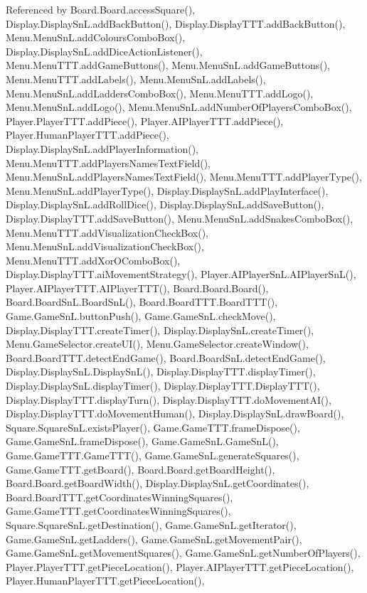 Referenced by Board.\+Board.\+access\+Square(), Display.\+Display\+Sn\+L.\+add\+Back\+Button(), Display.\+Display\+T\+T\+T.\+add\+Back\+Button(), Menu.\+Menu\+Sn\+L.\+add\+Colours\+Combo\+Box(), Display.\+Display\+Sn\+L.\+add\+Dice\+Action\+Listener(), Menu.\+Menu\+T\+T\+T.\+add\+Game\+Buttons(), Menu.\+Menu\+Sn\+L.\+add\+Game\+Buttons(), Menu.\+Menu\+T\+T\+T.\+add\+Labels(), Menu.\+Menu\+Sn\+L.\+add\+Labels(), Menu.\+Menu\+Sn\+L.\+add\+Ladders\+Combo\+Box(), Menu.\+Menu\+T\+T\+T.\+add\+Logo(), Menu.\+Menu\+Sn\+L.\+add\+Logo(), Menu.\+Menu\+Sn\+L.\+add\+Number\+Of\+Players\+Combo\+Box(), Player.\+Player\+T\+T\+T.\+add\+Piece(), Player.\+A\+I\+Player\+T\+T\+T.\+add\+Piece(), Player.\+Human\+Player\+T\+T\+T.\+add\+Piece(), Display.\+Display\+Sn\+L.\+add\+Player\+Information(), Menu.\+Menu\+T\+T\+T.\+add\+Players\+Names\+Text\+Field(), Menu.\+Menu\+Sn\+L.\+add\+Players\+Names\+Text\+Field(), Menu.\+Menu\+T\+T\+T.\+add\+Player\+Type(), Menu.\+Menu\+Sn\+L.\+add\+Player\+Type(), Display.\+Display\+Sn\+L.\+add\+Play\+Interface(), Display.\+Display\+Sn\+L.\+add\+Roll\+Dice(), Display.\+Display\+Sn\+L.\+add\+Save\+Button(), Display.\+Display\+T\+T\+T.\+add\+Save\+Button(), Menu.\+Menu\+Sn\+L.\+add\+Snakes\+Combo\+Box(), Menu.\+Menu\+T\+T\+T.\+add\+Visualization\+Check\+Box(), Menu.\+Menu\+Sn\+L.\+add\+Visualization\+Check\+Box(), Menu.\+Menu\+T\+T\+T.\+add\+Xor\+O\+Combo\+Box(), Display.\+Display\+T\+T\+T.\+ai\+Movement\+Strategy(), Player.\+A\+I\+Player\+Sn\+L.\+A\+I\+Player\+Sn\+L(), Player.\+A\+I\+Player\+T\+T\+T.\+A\+I\+Player\+T\+T\+T(), Board.\+Board.\+Board(), Board.\+Board\+Sn\+L.\+Board\+Sn\+L(), Board.\+Board\+T\+T\+T.\+Board\+T\+T\+T(), Game.\+Game\+Sn\+L.\+button\+Push(), Game.\+Game\+Sn\+L.\+check\+Move(), Display.\+Display\+T\+T\+T.\+create\+Timer(), Display.\+Display\+Sn\+L.\+create\+Timer(), Menu.\+Game\+Selector.\+create\+U\+I(), Menu.\+Game\+Selector.\+create\+Window(), Board.\+Board\+T\+T\+T.\+detect\+End\+Game(), Board.\+Board\+Sn\+L.\+detect\+End\+Game(), Display.\+Display\+Sn\+L.\+Display\+Sn\+L(), Display.\+Display\+T\+T\+T.\+display\+Timer(), Display.\+Display\+Sn\+L.\+display\+Timer(), Display.\+Display\+T\+T\+T.\+Display\+T\+T\+T(), Display.\+Display\+T\+T\+T.\+display\+Turn(), Display.\+Display\+T\+T\+T.\+do\+Movement\+A\+I(), Display.\+Display\+T\+T\+T.\+do\+Movement\+Human(), Display.\+Display\+Sn\+L.\+draw\+Board(), Square.\+Square\+Sn\+L.\+exists\+Player(), Game.\+Game\+T\+T\+T.\+frame\+Dispose(), Game.\+Game\+Sn\+L.\+frame\+Dispose(), Game.\+Game\+Sn\+L.\+Game\+Sn\+L(), Game.\+Game\+T\+T\+T.\+Game\+T\+T\+T(), Game.\+Game\+Sn\+L.\+generate\+Squares(), Game.\+Game\+T\+T\+T.\+get\+Board(), Board.\+Board.\+get\+Board\+Height(), Board.\+Board.\+get\+Board\+Width(), Display.\+Display\+Sn\+L.\+get\+Coordinates(), Board.\+Board\+T\+T\+T.\+get\+Coordinates\+Winning\+Squares(), Game.\+Game\+T\+T\+T.\+get\+Coordinates\+Winning\+Squares(), Square.\+Square\+Sn\+L.\+get\+Destination(), Game.\+Game\+Sn\+L.\+get\+Iterator(), Game.\+Game\+Sn\+L.\+get\+Ladders(), Game.\+Game\+Sn\+L.\+get\+Movement\+Pair(), Game.\+Game\+Sn\+L.\+get\+Movement\+Squares(), Game.\+Game\+Sn\+L.\+get\+Number\+Of\+Players(), Player.\+Player\+T\+T\+T.\+get\+Piece\+Location(), Player.\+A\+I\+Player\+T\+T\+T.\+get\+Piece\+Location(), Player.\+Human\+Player\+T\+T\+T.\+get\+Piece\+Location(), 